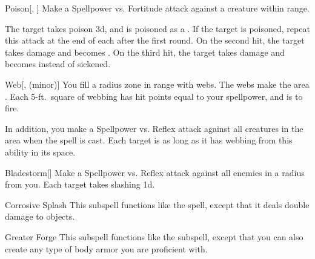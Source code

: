 \begin{ability}[\nth{2}]{Poison}[, ]
Make a Spellpower vs. Fortitude attack against a creature within \rngmed range.

\hit The target takes poison  \minus3d, and is poisoned as a .
If the target is poisoned, repeat this attack at the end of each  after the first round.
On the second hit, the target takes damage and becomes .
On the third hit, the target takes damage and becomes  instead of sickened.
\end{ability}
\vspace{0.25em}


\begin{ability}[\nth{2}]{Web}[,  (minor)]
You fill a \areasmall radius zone in \rngclose range with webs.
The webs make the area .
Each 5-ft.\ square of webbing has hit points equal to your spellpower, and is  to fire.

In addition, you make a Spellpower vs. Reflex attack against all creatures in the area when the spell is cast.
\hit Each target is \immobilized as long as it has webbing from this ability in its space.
\end{ability}
\vspace{0.25em}


\begin{ability}[\nth{3}]{Bladestorm}[]
Make a Spellpower vs. Reflex attack against all enemies in a \areasmall radius from you.
\hit Each target takes slashing  \minus1d.
\end{ability}
\vspace{0.25em}


\begin{ability}[\nth{3}]{Corrosive Splash}
This subspell functions like the  spell, except that it deals double damage to objects.
\end{ability}
\vspace{0.25em}


\begin{ability}[\nth{3}]{Greater Forge}
This subspell functions like the  subspell, except that you can also create any type of body armor you are proficient with.
\end{ability}
\vspace{0.25em}


